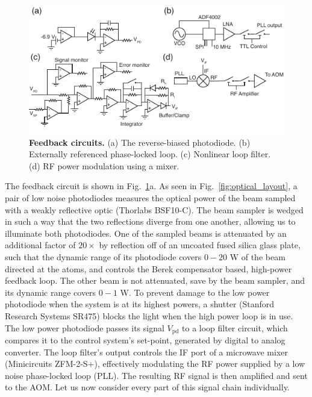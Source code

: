 \documentclass[twocolumn,aps,pra,showpacs,preprintnumbers,bibnotes]{revtex4-1}
\begin{document}
\begin{figure}
  \begin{center}
    \includegraphics{fig/circuits.pdf}
    \caption{\textbf{Feedback circuits.} (a) The reverse-biased photodiode. (b) Externally referenced phase-locked loop. (c) Nonlinear loop filter. (d) RF power modulation using a mixer.}\label{fig:circuits}
  \end{center}
\end{figure}
The feedback circuit is shown in Fig.~\ref{fig:circuits}a. As seen in Fig.~\ref{fig:optical_layout}, a pair of low noise photodiodes measures the optical power of the beam sampled with a weakly reflective optic (Thorlabs BSF10-C).
The beam sampler is wedged in such a way that the two reflections diverge from one another, allowing us to illuminate both photodiodes.
One of the sampled beams is attenuated by an additional factor of $20\times$ by reflection off of an uncoated fused silica glass plate, such that the dynamic range of its photodiode covers $0-20$ W of the beam directed at the atoms, and controls the Berek compensator based, high-power feedback loop.
The other beam is not attenuated, save by the beam sampler, and its dynamic range covers $0-1$ W.
To prevent damage to the low power photodiode when the system is at its highest powers, a shutter (Stanford Research Systems SR475) blocks the light when the high power loop is in use.
The low power photodiode passes its signal $V_{\mathrm{pd}}$ to a loop filter circuit, which compares it to the control system's set-point, generated by digital to analog converter.
The loop filter's output controls the IF port of a microwave mixer (Minicircuits ZFM-2-S+), effectively modulating the RF power supplied by a low noise phase-locked loop (PLL).
The resulting RF signal is then amplified and sent to the AOM.
Let us now consider every part of this signal chain individually.
\end{document}
